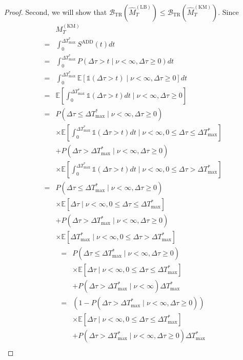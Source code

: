\documentclass{article}
\theoremstyle{plain}
\theoremstyle{definition}
\theoremstyle{remark}
\def\nn{\nonumber \\ }
\def\mbe{\mathbb{E}}
\def\mbone{\mathds{1}}
\begin{document}
\begin{proof}
    Second, we will show that $\mathcal{B}_\mathrm{TR}(\hat{M}_T^\mathrm{(LB)}) \leq \mathcal{B}_\mathrm{TR}(\hat{M}_T^\mathrm{(KM)})$.
    Since
    \begin{align}
        &M_T^\mathrm{(KM)} \nn 
        =& \int_0^{\Delta T_\mathrm{max}^*} S^\mathrm{ADD}(t) dt \\
        =&  \int_0^{\Delta T_\mathrm{max}^*}  P(\Delta \tau > t \mid \nu < \infty, \Delta \tau \geq 0) dt\\
        =&  \int_0^{\Delta T_\mathrm{max}^*} \mbe[\mbone(\Delta \tau > t) \mid \nu < \infty, \Delta \tau \geq 0] dt\\
        =&  \mbe [\int_0^{\Delta T_\mathrm{max}^*} \mbone(\Delta \tau > t) dt \mid \nu < \infty, \Delta \tau \geq 0] \\
        =&  P(\Delta \tau \leq \Delta T_\mathrm{max}^* \mid \nu < \infty, \Delta \tau \geq 0) \nn
            &\times \mbe[ \int_0^{\Delta T_\mathrm{max}^*} \mbone(\Delta \tau > t)  dt \mid \nu < \infty,  0 \leq \Delta \tau \leq \Delta T_\mathrm{max}^* ] \nn
            &+  P(\Delta \tau > \Delta T_\mathrm{max}^* \mid \nu < \infty, \Delta \tau \geq 0) \nn
            &\times \mbe[ \int_0^{\Delta T_\mathrm{max}^*} \mbone(\Delta \tau > t)  dt \mid \nu < \infty,  0 \leq \Delta \tau > \Delta T_\mathrm{max}^*] \\
        =&  P(\Delta \tau \leq \Delta T_\mathrm{max}^* \mid \nu < \infty , \Delta \tau \geq 0) \nn
            &\times \mbe[ \Delta \tau \mid \nu < \infty, 0 \leq  \Delta \tau \leq \Delta T_\mathrm{max}^*] \nn
            &+  P(\Delta \tau > \Delta T_\mathrm{max}^* \mid \nu < \infty, \Delta \tau \geq 0 ) \nn
            &\times \mbe[ \Delta T_\mathrm{max}^*  \mid \nu < \infty, 0 \leq \Delta \tau > \Delta T_\mathrm{max}^*] 
    \end{align}
    \begin{align}
        =& P(\Delta \tau \leq \Delta T_\mathrm{max}^* \mid \nu < \infty, \Delta \tau \geq 0) \nn 
            &\times \mbe[ \Delta \tau \mid \nu < \infty, 0 \leq \Delta \tau \leq \Delta T_\mathrm{max}^*] \nn
            &+  P(\Delta \tau > \Delta T_\mathrm{max}^* \mid \nu < \infty) 
            \Delta T_\mathrm{max}^*  \\
        =& (1 - P(\Delta \tau > \Delta T_\mathrm{max}^* \mid \nu < \infty, \Delta \tau \geq 0)) \nn 
            &\times \mbe[ \Delta \tau \mid \nu < \infty, 0 \leq \Delta \tau \leq \Delta T_\mathrm{max}^*] \nn
            &+  P(\Delta \tau > \Delta T_\mathrm{max}^* \mid \nu < \infty, \Delta \tau \geq 0) 
            \Delta T_\mathrm{max}^* \\

\end{align}
\end{proof}
\end{document}
